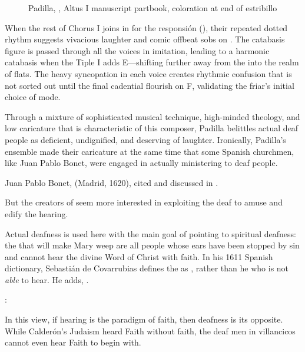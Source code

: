 \begin{figure}
    \caption{Padilla, , Altus I manuscript 
    partbook, coloration at end of estribillo}
    \label{figure:Padilla-Sordo1651-AI-coloration}
\end{figure}


When the rest of Chorus I joins in for the responsión
(), their repeated dotted 
rhythm suggests vivacious laughter and comic offbeat sobs on .
The catabasis figure is passed through all the voices in imitation, leading to 
a harmonic catabasis when the Tiple I adds E\fl{}---shifting further away from 
the  into the  realm of flats.
The heavy syncopation in each voice creates rhythmic confusion that is not 
sorted out until the final cadential flourish on F, validating the friar's 
initial choice of mode.

\begin{exmusic}
    \caption{Padilla, , , extant voices}
    \label{exmusic:Padilla-Sordo-responsion}
\end{exmusic}

Through a mixture of sophisticated musical technique, high-minded theology, and 
low caricature that is characteristic of this composer, Padilla belittles 
actual deaf people as deficient, undignified, and deserving of laughter.
Ironically, Padilla's ensemble made their caricature at the same time that some 
Spanish churchmen, like Juan Pablo Bonet, were engaged in actually ministering 
to deaf people.%
\begin{Footnote}
    Juan Pablo Bonet,  (Madrid, 1620), cited and discussed in 
    \autocite{Plann:DeafEducationSpain}.
\end{Footnote}
But the creators of  seem more interested in 
exploiting the deaf to amuse and edify the hearing.

Actual deafness is used here with the main goal of pointing to spiritual 
deafness: the  that will make Mary weep are all people whose 
ears have been stopped by sin and cannot hear the divine Word of Christ with 
faith.
In his 1611 Spanish dictionary, Sebastián de Covarrubias defines the 
 as , rather than he who is not 
\emph{able} to hear.
He adds, .%
\begin{Footnote}
    \Autocite[]{Covarrubias:Tesoro}:
\end{Footnote}
In this view, if hearing is the paradigm of faith, then deafness is its 
opposite.
While Calderón's Judaism heard Faith without faith, the deaf men in villancicos 
cannot even hear Faith to begin with.

